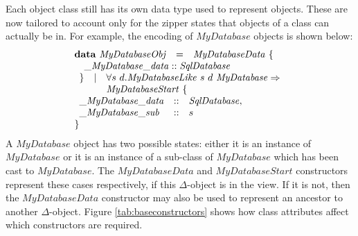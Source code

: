Each object class still has its own data type used to represent objects. These are now tailored to account only for the zipper states that objects of a class can actually be in. For example, the encoding of $\mathit{MyDatabase}$ objects is shown below: 
\begin{displaymath}
\begin{array}{lcl}
\mathbf{data}~\mathit{MyDatabaseObj} & = & \mathit{MyDatabaseData}~\{ \\ 
\multicolumn{3}{l}{\quad \_\mathit{MyDatabase}\_\mathit{data} :: \mathit{SqlDatabase}}\\
\multicolumn{3}{l}{\begin{array}{lcl}
    \} & \mid & \forall s~d.\mathit{MyDatabaseLike}~s~d~\mathit{MyDatabase} \Rightarrow \\
    & &  \mathit{MyDatabaseStart}~\{
    \end{array}}  \\
\multicolumn{3}{l}{\begin{array}{lcl}
    \_\mathit{MyDatabase}\_\mathit{data} & :: & \mathit{SqlDatabase},\\
    \_\mathit{MyDatabase}\_\mathit{sub}  & :: & s
    \end{array}}\\
\} &&
\end{array}
\end{displaymath}
A $\mathit{MyDatabase}$ object has two possible states: either it is an instance of $\mathit{MyDatabase}$ or it is an instance of a sub-class of $\mathit{MyDatabase}$ which has been cast to $\mathit{MyDatabase}$. The $\mathit{MyDatabaseData}$ and $\mathit{MyDatabaseStart}$ constructors represent these cases respectively, if this $\Delta$-object is in the view. If it is not, then the $\mathit{MyDatabaseData}$ constructor may also be used to represent an ancestor to another $\Delta$-object. Figure \ref{tab:baseconstructors} shows how class attributes affect which constructors are required.
